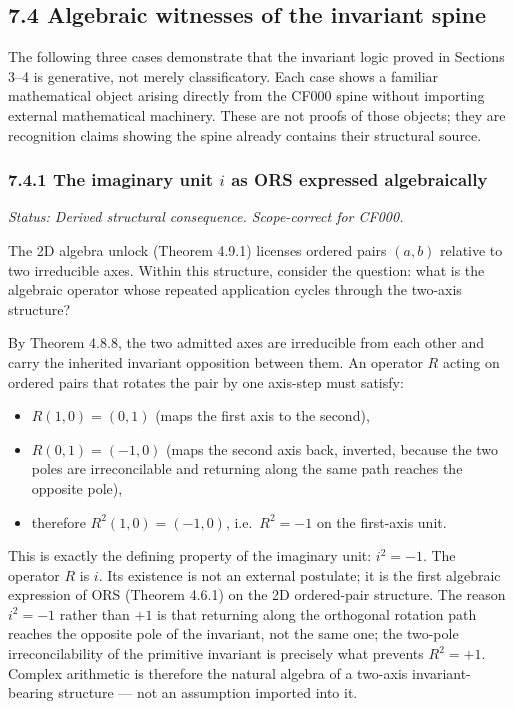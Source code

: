 \documentclass[11pt]{article}
\begin{document}
\subsection{7.4 Algebraic witnesses of the invariant spine}\label{algebraic-witnesses}

The following three cases demonstrate that the invariant logic proved in Sections 3--4
is generative, not merely classificatory. Each case shows a familiar mathematical
object arising directly from the CF000 spine without importing external mathematical
machinery. These are not proofs of those objects; they are recognition claims showing
the spine already contains their structural source.

\subsubsection*{7.4.1 The imaginary unit $i$ as ORS expressed algebraically}

\textit{Status: Derived structural consequence. Scope-correct for CF000.}

The 2D algebra unlock (Theorem 4.9.1) licenses ordered pairs $(a, b)$ relative to
two irreducible axes. Within this structure, consider the question: what is the
algebraic operator whose repeated application cycles through the two-axis structure?

By Theorem 4.8.8, the two admitted axes are irreducible from each other and carry
the inherited invariant opposition between them. An operator $R$ acting on ordered
pairs that rotates the pair by one axis-step must satisfy:

\begin{itemize}
\item $R(1, 0) = (0, 1)$ (maps the first axis to the second),
\item $R(0, 1) = (-1, 0)$ (maps the second axis back, inverted, because the two
      poles are irreconcilable and returning along the same path reaches the
      opposite pole),
\item therefore $R^2(1, 0) = (-1, 0)$, i.e.\ $R^2 = -1$ on the first-axis unit.
\end{itemize}

This is exactly the defining property of the imaginary unit: $i^2 = -1$. The
operator $R$ is $i$. Its existence is not an external postulate; it is the first
algebraic expression of ORS (Theorem 4.6.1) on the 2D ordered-pair structure.
The reason $i^2 = -1$ rather than $+1$ is that returning along the orthogonal
rotation path reaches the opposite pole of the invariant, not the same one; the
two-pole irreconcilability of the primitive invariant is precisely what prevents
$R^2 = +1$. Complex arithmetic is therefore the natural algebra of a two-axis
invariant-bearing structure --- not an assumption imported into it.
\end{document}
